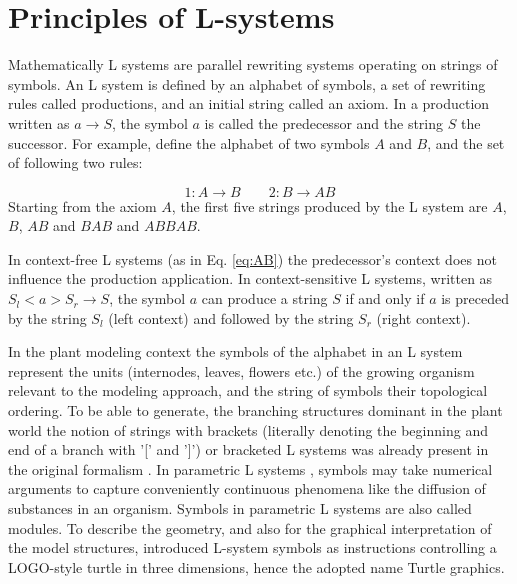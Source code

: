 \section{Principles of L-systems}

Mathematically L  systems are parallel rewriting  systems operating on
strings of symbols. An L system  is defined by an alphabet of symbols,
a set  of rewriting  rules called productions,  and an  initial string
called an  axiom. In  a production written  as $a \rightarrow  S$, the
symbol $a$ is called the predecessor and the string $S$ the successor.
For example, define  the alphabet of two symbols $A$  and $B$, and the
set of following two rules:

\begin{equation}\label{eq:AB}
1: A \rightarrow B \qquad 2: B \rightarrow AB 
\end{equation}
Starting from the axiom $A$, the  first five strings produced by the L
system are $A$, $B$, $AB$ and $BAB$ and $ABBAB$.

In context-free  L systems (as in Eq.   \ref{eq:AB}) the predecessor's
context   does   not  influence   the   production  application.    In
context-sensitive L systems, written as $S_l < a > S_r \rightarrow S$,
the symbol $a$ can produce a string $S$ if and only if $a$ is preceded
by the  string $S_l$ (left context)  and followed by  the string $S_r$
(right context).

In the  plant modeling  context the  symbols of the  alphabet in  an L
system represent the units  (internodes, leaves, flowers etc.)  of the
growing organism relevant to the  modeling approach, and the string of
symbols  their topological  ordering.   To be  able  to generate,  the
branching structures dominant in the plant world the notion of strings
with brackets  (literally denoting the  beginning and end of  a branch
with '['  and ']') or bracketed  L systems was already  present in the
original  formalism \citep{lindenmayer:68}.   In parametric  L systems
\citep{pp:90a},  symbols  may  take  numerical  arguments  to  capture
conveniently continuous phenomena like  the diffusion of substances in
an organism.  Symbols in parametric L systems are also called modules.
To describe the geometry, and also for the graphical interpretation of
the  model structures,  \citet{pp:86} introduced  L-system  symbols as
instructions  controlling a  LOGO-style  turtle \citep{abelson:82}  in
three dimensions, hence the adopted name Turtle graphics.

